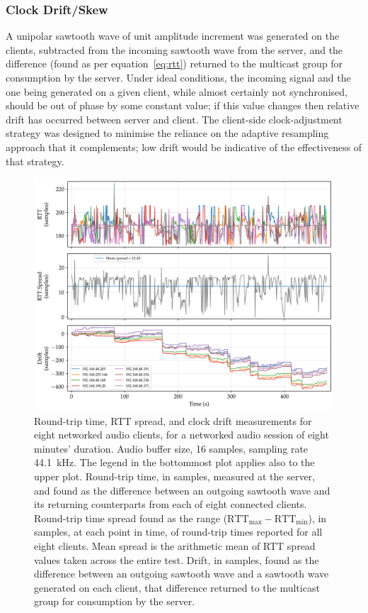 \subsubsection{Clock Drift/Skew}
A unipolar sawtooth wave of unit amplitude increment was generated on the
clients, subtracted from the incoming sawtooth wave from the server, and the
difference (found as per equation~\eqref{eq:rtt}) returned to the multicast
group for consumption by the server.
Under ideal conditions, the incoming signal and the one being generated on a
given client, while almost certainly not synchronised, should be out of phase by
some constant value;
if this value changes then relative drift has occurred between server and
client.
The client-side clock-adjustment strategy was designed to minimise the reliance
on the adaptive resampling approach that it complements;
low drift would be indicative of the effectiveness of that strategy.

\begin{figure}[ht]
    \centering
    \includegraphics[width=\textwidth]{figures/rtt_drift_16}
    \caption{
        Round-trip time, RTT spread, and clock drift measurements for eight
        networked audio clients, for a networked audio session of eight minutes'
        duration.
        Audio buffer size, 16 samples, sampling rate \qty{44.1}{\kHz}.
        The legend in the bottommost plot applies also to the upper plot.
        Round-trip time, in samples, measured at the server, and found as the
        difference between an outgoing sawtooth wave and its returning
        counterparts from each of eight connected clients.
        Round-trip time spread found as the range ($\text{RTT}_{\max} -
        \text{RTT}_{\min}$), in samples, at each point in time, of
        round-trip times reported for all eight clients.
        Mean spread is the arithmetic mean of RTT spread values taken across
        the entire test.
        Drift, in samples, found as the difference between an outgoing sawtooth
        wave and a sawtooth wave generated on each client, that difference
        returned to the multicast group for consumption by the server.
    }
    \label{fig:rtt-drift-16}
\end{figure}

